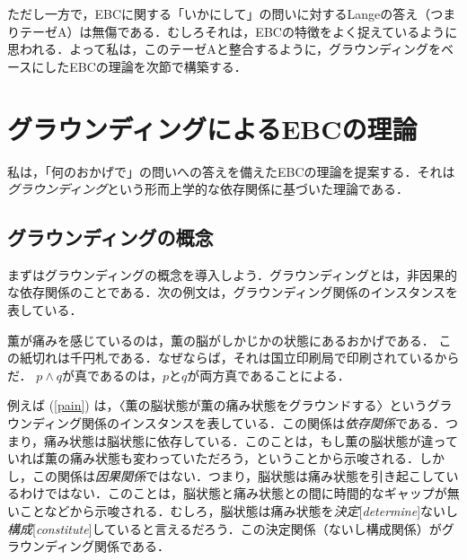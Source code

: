\documentclass[dvipdfmx,twoside,11pt,uplatex]{jsarticle}
\newcommand{\myterm}[2]{{\emph{#1}}{[\emph{#2}]}}
\theoremstyle{definition}
\begin{document}
ただし一方で，EBCに関する「いかにして」の問いに対するLangeの答え（つまりテーゼA）は無傷である．むしろそれは，EBCの特徴をよく捉えているように思われる．よって私は，このテーゼAと整合するように，グラウンディングをベースにしたEBCの理論を次節で構築する．

\section{グラウンディングによるEBCの理論}\label{ebcbyground}
私は，「何のおかげで」の問いへの答えを備えたEBCの理論を提案する．それは\emph{グラウンディング}という形而上学的な依存関係に基づいた理論である．

\subsection{グラウンディングの概念}
まずはグラウンディングの概念を導入しよう．グラウンディングとは，非因果的な依存関係のことである\citep[see][]{fine2001realism,schaffer2009grounds,rosen2010dependence}．次の例文は，グラウンディング関係のインスタンスを表している．
\begin{exe}
    \ex
        \begin{xlist}
            \ex 薫が痛みを感じているのは，薫の脳がしかじかの状態にあるおかげである．\label{pain}
            \ex この紙切れは千円札である．なぜならば，それは国立印刷局で印刷されているからだ．
            \ex $p\land q$が真であるのは，$p$と$q$が両方真であることによる．
        \end{xlist}
\end{exe}
例えば (\ref{pain}) は，〈薫の脳状態が薫の痛み状態をグラウンドする〉というグラウンディング関係のインスタンスを表している．この関係は\emph{依存関係}である．つまり，痛み状態は脳状態に依存している．このことは，もし薫の脳状態が違っていれば薫の痛み状態も変わっていただろう，ということから示唆される．しかし，この関係は\emph{因果関係}ではない．つまり，脳状態は痛み状態を引き起こしているわけではない．このことは，脳状態と痛み状態との間に時間的なギャップが無いことなどから示唆される．むしろ，脳状態は痛み状態を\myterm{決定}{determine}ないし\myterm{構成}{constitute}していると言えるだろう．この決定関係（ないし構成関係）がグラウンディング関係である．
\end{document}
